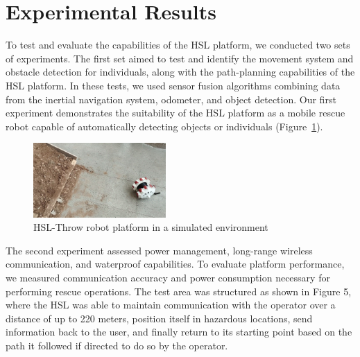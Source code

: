 \documentclass[conference]{IEEEtran}
\begin{document}
\section{Experimental Results} 
To test and evaluate the capabilities of the HSL platform, we conducted two sets of experiments. The first set aimed to test and identify the movement system and obstacle detection for individuals, along with the path-planning capabilities of the HSL platform. In these tests, we used sensor fusion algorithms combining data from the inertial navigation system, odometer, and object detection. Our first experiment demonstrates the suitability of the HSL platform as a mobile rescue robot capable of automatically detecting objects or individuals (Figure~\ref{Fig_HSL-Throw}).

\begin{figure}[htbp] 
    \centerline{\includegraphics[width=0.45\textwidth]{HSL-Throw.png}} 
    \caption{HSL-Throw robot platform in a simulated environment}
    \label{Fig_HSL-Throw} 
\end{figure}

The second experiment assessed power management, long-range wireless communication, and waterproof capabilities. To evaluate platform performance, we measured communication accuracy and power consumption necessary for performing rescue operations. The test area was structured as shown in Figure 5, where the HSL was able to maintain communication with the operator over a distance of up to 220 meters, position itself in hazardous locations, send information back to the user, and finally return to its starting point based on the path it followed if directed to do so by the operator.
\end{document}
